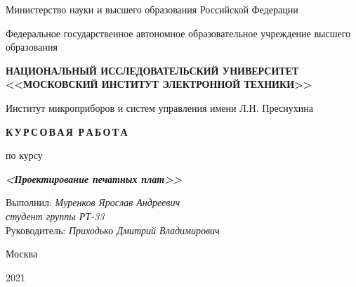 \thispagestyle{empty}
\setcounter{page}{0}

\begin{center}
    Министерство науки  и высшего образования Российской Федерации

    \vspace{1ex}

    Федеральное государственное автономное образовательное учреждение высшего образования

    \textbf{НАЦИОНАЛЬНЫЙ ИССЛЕДОВАТЕЛЬСКИЙ УНИВЕРСИТЕТ <<МОСКОВСКИЙ ИНСТИТУТ ЭЛЕКТРОННОЙ ТЕХНИКИ>>}

    \vspace{1ex}

    Институт микроприборов и систем управления имени Л.Н. Преснухина
\end{center}

\vspace{13ex}

\begin{center}
    \textbf{К\,У\,Р\,С\,О\,В\,А\,Я\, Р\,А\,Б\,О\,Т\,А}
    \vspace{1ex}

    по курсу

    \textbf{\textit{<Проектирование печатных плат>>}}

\end{center}

\vspace{20ex}

\begin{flushright}
    \noindent
    Выполнил: \textit{Муренков Ярослав Андреевич} \\
    \textit{студент группы РТ-33} \\
    Руководитель: \textit{Приходько Дмитрий Владимирович}
\end{flushright}

\vfill

\begin{center}
    Москва

    2021
\end{center}

\newpage
